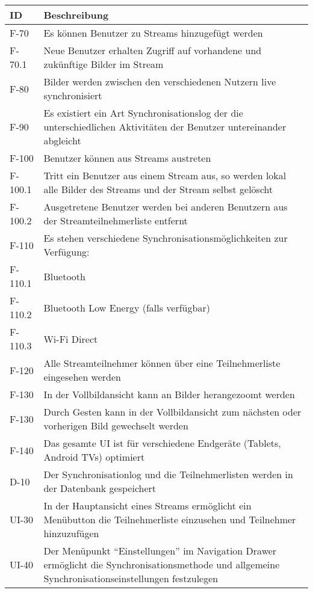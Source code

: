 \begin{center}
\begin{longtable}{|l|p{12cm}|}
\toprule
\textbf{ID} & \textbf{Beschreibung} \\
\hline
\endhead
\hline
\endfoot
F-70 & Es können Benutzer zu Streams hinzugefügt werden\\
F-70.1 & Neue Benutzer erhalten Zugriff auf vorhandene und zukünftige Bilder im Stream\\
F-80 & Bilder werden zwischen den verschiedenen Nutzern live synchronisiert\\
F-90 & Es existiert ein Art Synchronisationslog der die unterschiedlichen Aktivitäten der Benutzer untereinander abgleicht\\
F-100 & Benutzer können aus Streams austreten \\
F-100.1 & Tritt ein Benutzer aus einem Stream aus, so werden lokal alle Bilder des Streams und der Stream selbst gelöscht\\
F-100.2 & Ausgetretene Benutzer werden bei anderen Benutzern aus der Streamteilnehmerliste entfernt\\
F-110 & Es stehen verschiedene Synchronisationsmöglichkeiten zur Verfügung:\\
F-110.1 & Bluetooth\\
F-110.2 & Bluetooth Low Energy (falls verfügbar)\\
F-110.3 & Wi-Fi Direct\\
F-120 & Alle Streamteilnehmer können über eine Teilnehmerliste eingesehen werden\\
F-130 & In der Vollbildansicht kann an Bilder herangezoomt werden\\
F-130 & Durch Gesten kann in der Vollbildansicht zum nächsten oder vorherigen Bild gewechselt werden\\
F-140 & Das gesamte UI ist für verschiedene Endgeräte (Tablets, Android TVs) optimiert\\
\hline
D-10 & Der Synchronisationlog und die Teilnehmerlisten werden in der Datenbank gespeichert\\
\hline
UI-30 & In der Hauptansicht eines Streams ermöglicht ein Menübutton die Teilnehmerliste einzusehen und Teilnehmer hinzuzufügen\\
UI-40 & Der Menüpunkt \enquote{Einstellungen} im Navigation Drawer ermöglicht die Synchronisationsmethode und allgemeine Synchronisationseinstellungen festzulegen\\
\end{longtable}
\end{center}